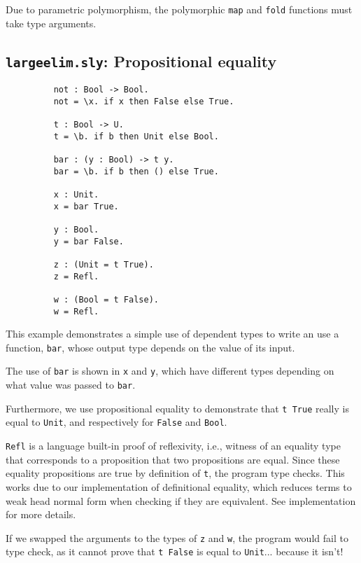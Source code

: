 Due to parametric polymorphism, the polymorphic \texttt{map} and \texttt{fold}
functions must take type arguments.
\newpage

\subsection{\texttt{largeelim.sly}: Propositional equality}
\begin{figure}[h!]
\begin{lstlisting}
    not : Bool -> Bool.
    not = \x. if x then False else True.
    
    t : Bool -> U.
    t = \b. if b then Unit else Bool.
    
    bar : (y : Bool) -> t y.
    bar = \b. if b then () else True.    

    x : Unit.
    x = bar True.

    y : Bool.
    y = bar False.

    z : (Unit = t True).
    z = Refl.

    w : (Bool = t False).
    w = Refl.
\end{lstlisting}
\end{figure}
This example demonstrates a simple use of dependent types to write an use a
function, \texttt{bar}, whose output type depends on the value of its input.

The use of \texttt{bar} is shown in \texttt{x} and \texttt{y}, which have
different types depending on what value was passed to \texttt{bar}.

Furthermore, we use propositional equality to demonstrate that \texttt{t True}
really is equal to \texttt{Unit}, and respectively for \texttt{False} and
\texttt{Bool}.

\texttt{Refl} is a language built-in proof of reflexivity, i.e., witness of an equality type that
corresponds to a proposition that two propositions are equal.
Since these equality propositions are true by definition of \texttt{t}, the
program type checks. This works due to our implementation of definitional
equality, which reduces terms to weak head normal form when checking if they
are equivalent. See implementation for more details.

If we swapped the arguments to the types of \texttt{z} and \texttt{w}, the
program would fail to type check, as it cannot prove that \texttt{t False} is
equal to \texttt{Unit}... because it isn't!

\newpage
